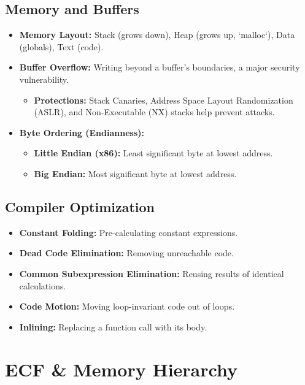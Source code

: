 \documentclass[10pt, twocolumn]{article}
\begin{document}
\subsection*{Memory and Buffers}
\begin{itemize}
    \item \textbf{Memory Layout:} Stack (grows down), Heap (grows up, `malloc`), Data (globals), Text (code).
    \item \textbf{Buffer Overflow:} Writing beyond a buffer's boundaries, a major security vulnerability.
    \begin{itemize}
        \item \textbf{Protections:} Stack Canaries, Address Space Layout Randomization (ASLR), and Non-Executable (NX) stacks help prevent attacks.
    \end{itemize}
    \item \textbf{Byte Ordering (Endianness):}
    \begin{itemize}
        \item \textbf{Little Endian (x86):} Least significant byte at lowest address.
        \item \textbf{Big Endian:} Most significant byte at lowest address.
    \end{itemize}
\end{itemize}

\subsection*{Compiler Optimization}
\begin{itemize}
    \item \textbf{Constant Folding:} Pre-calculating constant expressions.
    \item \textbf{Dead Code Elimination:} Removing unreachable code.
    \item \textbf{Common Subexpression Elimination:} Reusing results of identical calculations.
    \item \textbf{Code Motion:} Moving loop-invariant code out of loops.
    \item \textbf{Inlining:} Replacing a function call with its body.
\end{itemize}

\section*{ECF \& Memory Hierarchy}
\end{document}
